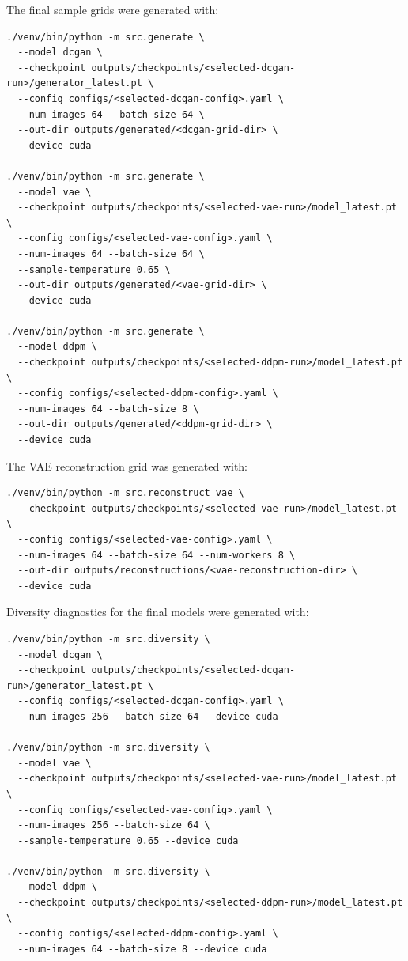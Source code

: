 \documentclass[11pt,a4paper]{article}
\begin{document}
The final sample grids were generated with:
\begin{verbatim}
./venv/bin/python -m src.generate \
  --model dcgan \
  --checkpoint outputs/checkpoints/<selected-dcgan-run>/generator_latest.pt \
  --config configs/<selected-dcgan-config>.yaml \
  --num-images 64 --batch-size 64 \
  --out-dir outputs/generated/<dcgan-grid-dir> \
  --device cuda

./venv/bin/python -m src.generate \
  --model vae \
  --checkpoint outputs/checkpoints/<selected-vae-run>/model_latest.pt \
  --config configs/<selected-vae-config>.yaml \
  --num-images 64 --batch-size 64 \
  --sample-temperature 0.65 \
  --out-dir outputs/generated/<vae-grid-dir> \
  --device cuda

./venv/bin/python -m src.generate \
  --model ddpm \
  --checkpoint outputs/checkpoints/<selected-ddpm-run>/model_latest.pt \
  --config configs/<selected-ddpm-config>.yaml \
  --num-images 64 --batch-size 8 \
  --out-dir outputs/generated/<ddpm-grid-dir> \
  --device cuda
\end{verbatim}

The VAE reconstruction grid was generated with:
\begin{verbatim}
./venv/bin/python -m src.reconstruct_vae \
  --checkpoint outputs/checkpoints/<selected-vae-run>/model_latest.pt \
  --config configs/<selected-vae-config>.yaml \
  --num-images 64 --batch-size 64 --num-workers 8 \
  --out-dir outputs/reconstructions/<vae-reconstruction-dir> \
  --device cuda
\end{verbatim}

Diversity diagnostics for the final models were generated with:
\begin{verbatim}
./venv/bin/python -m src.diversity \
  --model dcgan \
  --checkpoint outputs/checkpoints/<selected-dcgan-run>/generator_latest.pt \
  --config configs/<selected-dcgan-config>.yaml \
  --num-images 256 --batch-size 64 --device cuda

./venv/bin/python -m src.diversity \
  --model vae \
  --checkpoint outputs/checkpoints/<selected-vae-run>/model_latest.pt \
  --config configs/<selected-vae-config>.yaml \
  --num-images 256 --batch-size 64 \
  --sample-temperature 0.65 --device cuda

./venv/bin/python -m src.diversity \
  --model ddpm \
  --checkpoint outputs/checkpoints/<selected-ddpm-run>/model_latest.pt \
  --config configs/<selected-ddpm-config>.yaml \
  --num-images 64 --batch-size 8 --device cuda
\end{verbatim}
\end{document}
